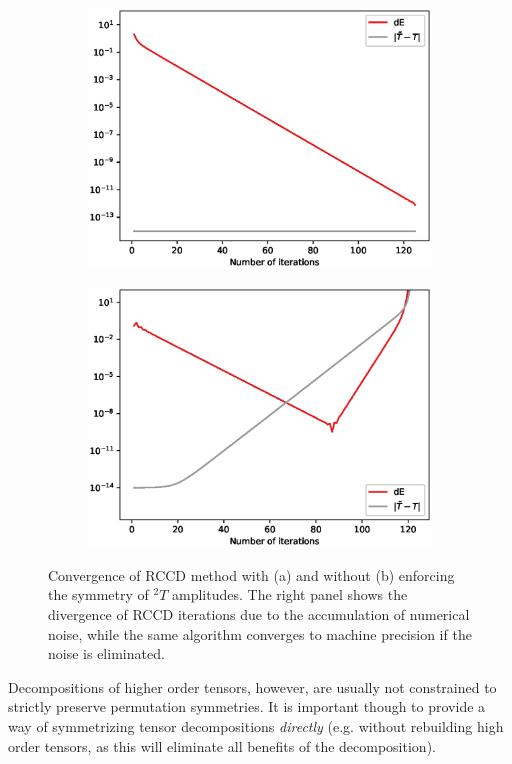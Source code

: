 \begin{figure}[!ht]
\centering
\begin{subfigure}[b]{0.70\textwidth}
\includegraphics[width=1\linewidth]{figures/tcc_theory/dE_vs_niter_u_3_stable}
   \caption{}
   \label{fig:symmetry_convergence_1} 
\end{subfigure}
\begin{subfigure}[b]{0.70\textwidth}
\includegraphics[width=1\linewidth]{figures/tcc_theory/dE_vs_niter_u_3_unst}
   \caption{}
   \label{fig:symmetry_convergence_2}
\end{subfigure}
\caption{Convergence of RCCD method with (a) and without (b) enforcing the 
symmetry of ${}^2 T$ amplitudes. The right panel shows the divergence of RCCD 
iterations due to the accumulation of numerical noise, while the same algorithm 
converges to machine precision if the noise is eliminated.}
\label{fig:symmetry_convergence}
\end{figure}
%
Decompositions of higher order tensors, however, are usually not constrained 
to strictly preserve permutation symmetries. It is important though to provide 
a way of symmetrizing tensor decompositions \emph{directly} (e.g. without 
rebuilding high order tensors, as this will eliminate all benefits of the 
decomposition).

